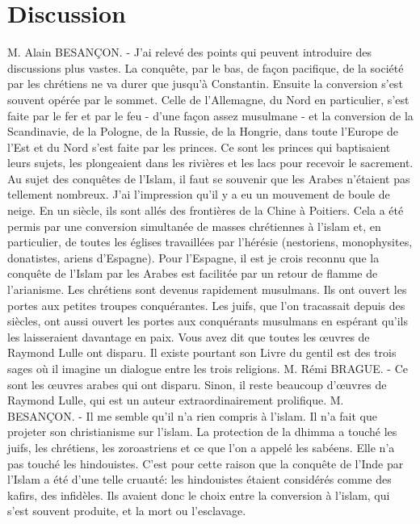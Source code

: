 \section{Discussion}
 M. Alain BESANÇON. - J'ai relevé des points qui peuvent introduire des discussions plus vastes. La conquête, par le bas, de façon pacifique, de la société par les chrétiens ne va durer que jusqu'à Constantin. Ensuite la conversion s'est souvent opérée par le sommet. Celle de l'Allemagne, du Nord en particulier, s'est faite par le fer et par le feu - d'une façon assez musulmane - et la conversion de la Scandinavie, de la Pologne, de la Russie, de la Hongrie, dans toute l'Europe de l'Est et du Nord s'est faite par les princes. Ce sont les princes qui baptisaient leurs sujets, les plongeaient dans les rivières et les lacs pour recevoir le sacrement. Au sujet des conquêtes de l'Islam, il faut se souvenir que les Arabes n'étaient pas tellement nombreux. J'ai l'impression qu'il y a eu un mouvement de boule de neige. En un siècle, ils sont allés des frontières de la Chine à Poitiers. Cela a été permis par une conversion simultanée de masses chrétiennes à l'islam et, en particulier, de toutes les églises travaillées par l'hérésie (nestoriens, monophysites, donatistes, ariens d'Espagne). Pour l'Espagne, il est je crois reconnu que la conquête de l'Islam par les Arabes est facilitée par un retour de flamme de l'arianisme. Les chrétiens sont devenus rapidement musulmans. Ils ont ouvert les portes aux petites troupes conquérantes. Les juifs, que l'on tracassait depuis des siècles, ont aussi ouvert les portes aux conquérants musulmans en espérant qu'ils les laisseraient davantage en paix.
Vous avez dit que toutes les œuvres de Raymond Lulle ont disparu. Il existe pourtant son Livre du gentil est des trois sages où il imagine un dialogue entre les trois religions.
\newline M. Rémi BRAGUE. - Ce sont les œuvres arabes qui ont disparu. Sinon, il reste beaucoup d'œuvres de Raymond Lulle, qui est un auteur extraordinairement prolifique.
\newline M. BESANÇON. - Il me semble qu'il n'a rien compris à l'islam. Il n'a fait que projeter son christianisme sur l'islam.
La protection de la dhimma a touché les juifs, les chrétiens, les zoroastriens et ce que l'on a appelé les sabéens. Elle n'a pas touché les hindouistes. C'est pour cette raison que la conquête de l'Inde par l'Islam a été d'une telle cruauté: les hindouistes étaient considérés comme des kafirs, des infidèles. Ils avaient donc le choix entre la conversion à l'islam, qui s'est souvent produite, et la mort ou l'esclavage.
